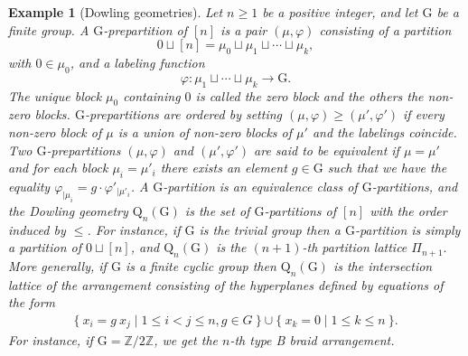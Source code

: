 \documentclass[11pt,a4paper]{amsart}
\theoremstyle{results}
\theoremstyle{definitions}
\newtheorem{example}[thm]{Example}
\def\Z{\mathbb{Z}}
\def\Z{\mathbb{Z}}
\newcommand{\QnG}{\textrm{Q}_n(\textrm{G})}
\newcommand{\G}{\textrm{G}}
\begin{document}
\begin{example}[Dowling geometries]\label{ex:dowling-geo} Let $n  \geqslant 1 $ be a positive integer, and let $\G$ be a finite group. A \emph{$\G$-prepartition} of $[n]$ is a pair $(\mu,\varphi)$ consisting of a partition 
\[
0\sqcup [n] = \mu_0 \sqcup \mu_1 \sqcup \cdots \sqcup \mu_k,
\] with $0 \in \mu_0$, and a labeling function 
\[
\varphi \colon \mu_1 \sqcup \cdots \sqcup \mu_k \rightarrow \G.
\] The unique block $\mu_0$ containing $0$ is called the zero block and the others the non-zero blocks. $\G$-prepartitions are ordered by setting $(\mu, \varphi) \geqslant(\mu', \varphi')$ if every non-zero block of $\mu$ is a union of non-zero blocks of $\mu'$ and the labelings coincide. Two $\G$-prepartitions $(\mu, \varphi)$ and $(\mu', \varphi')$ are said to be equivalent if $\mu = \mu'$ and for each block $\mu_i = \mu'_i$ there exists an element $g\in \G$ such that we have the equality $\varphi_{|\mu_i} = g\cdot \varphi'_{|\mu'_i}$.  A $\G$-partition is an equivalence class of $\G$-partitions, and the Dowling geometry $\QnG$ is the set of $\G$-partitions of $[n]$ with the order induced by $\leqslant$. For instance, if $\G$ is the trivial group then a $\G$-partition is simply a partition of $0 \sqcup [n]$, and $\QnG$ is the $(n+1)$-th partition lattice $\Pi_{n+1}.$ More generally, if $\G$ is a finite cyclic group then $\QnG$ is the intersection lattice of the arrangement consisting of the hyperplanes defined by equations of the form 
\begin{align*}
\{ \: x_i = g \: x_j \mid 1 \leqslant i < j \leqslant n, g \in G \: \} \cup \{\: x_k = 0 \mid 1 \leqslant k \leqslant n \: \}. 
\end{align*}
For instance, if $\G = \Z/2\Z$, we get the $n$-th type B braid arrangement. 


\end{example}
\end{document}
